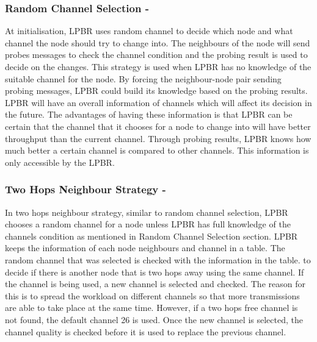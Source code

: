 \subsubsection{Random Channel Selection -}
At initialisation, LPBR uses random channel to decide which node and what channel the node should try to change into. The neighbours of the node will send probes messages to check the channel condition and the probing result is used to decide on the changes. This strategy is used when LPBR has no knowledge of the suitable channel for the node. By forcing the neighbour-node pair sending probing messages, LPBR could build its knowledge based on the probing results. LPBR will have an overall information of channels which will affect its decision in the future. The advantages of having these information is that LPBR can be certain that the channel that it chooses for a node to change into will have better throughput than the current channel. Through probing results, LPBR knows how much better a certain channel is compared to other channels. This information is only accessible by the LPBR. 
	
\subsubsection{Two Hops Neighbour Strategy -}
In two hops neighbour strategy, similar to random channel selection, LPBR chooses a random channel for a node unless LPBR has full knowledge of the channels condition as mentioned in Random Channel Selection section. LPBR keeps the information of each node neighbours and channel in a table. The random channel that was selected is checked with the information in the table. to decide if there is another node that is two hops away using the same channel. If the channel is being used, a new channel is selected and checked. The reason for this is to spread the workload on different channels so that more transmissions are able to take place at the same time. However, if a two hops free channel is not found, the default channel 26 is used. Once the new channel is selected, the channel quality is checked before it is used to replace the previous channel.


